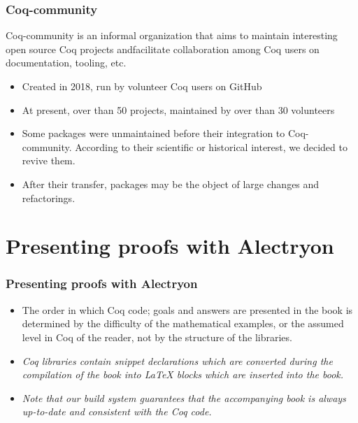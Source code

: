 \documentclass[10pt]{beamer}
\newcommand{\coq}{Coq\xspace}
\newcommand{\community}{Coq-community\xspace}
\newcommand{\alectr}{Alectryon\xspace}
\begin{document}
  \begin{frame}
    \frametitle{\community}
    \begin{block}{}
      \community is an informal organization that aims to maintain interesting open source \coq projects  andfacilitate collaboration among Coq users on documentation, tooling, etc.
      \begin{itemize}
      \item Created in 2018,  run by volunteer Coq users on GitHub
      \item At present, over than 50 projects, maintained by over than 30 volunteers
      \item Some packages were unmaintained before their integration to \community. According to their scientific or historical interest, we decided to revive them.
        \item After their transfer, packages may be the object of large changes  and refactorings.
      \end{itemize}
    \end{block}
  \end{frame}

\section{Presenting proofs with \alectr}
\begin{frame}
  \frametitle{Presenting proofs with \alectr}
  \begin{block}{}
    \begin{itemize}
    \item The order in which \coq code; goals and answers are presented in the book is determined by the difficulty of the mathematical examples, or the assumed level in \coq of the reader, not by the structure of the libraries.
    \item
      \emph{\coq libraries contain \emph{snippet declarations} which are converted during the compilation of the book into \LaTeX\xspace blocks which are inserted into the book.}

    \item {\color{lookcolor} \emph{Note that our build system guarantees that the accompanying book is always up-to-date and consistent with the \coq code.}}
    \end{itemize}
  \end{block}
\end{frame}
\end{document}
